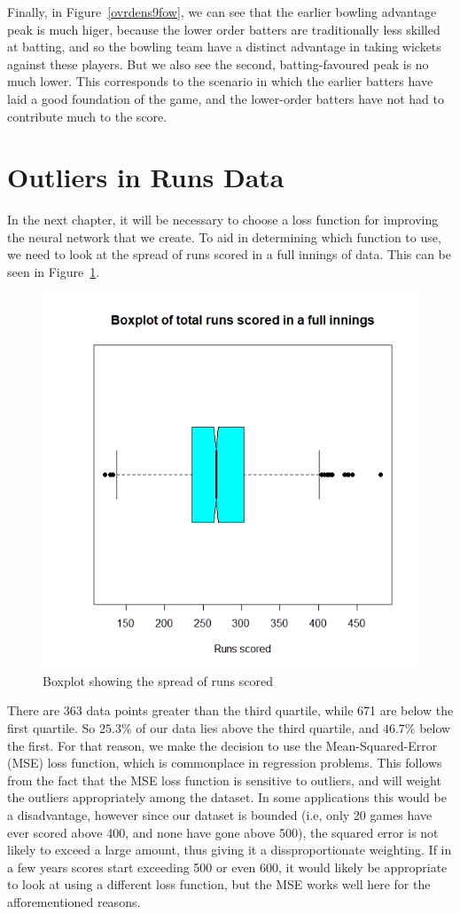 Finally, in Figure~\ref{ovrdens9fow}, we can see that the earlier bowling advantage peak is much higer, because the lower order batters are traditionally less skilled 
at batting, and so the bowling team have a distinct advantage in taking wickets against these players. But we also see the second, batting-favoured peak is no much lower.
This corresponds to the scenario in which the earlier batters have laid a good foundation of the game, and the lower-order batters have not had to contribute much to the score.

\section{Outliers in Runs Data}
\label{mse}
In the next chapter, it will be necessary to choose a loss function for improving the neural network that we create. To aid in determining which function to use, we need to look at the
spread of runs scored in a full innings of data. This can be seen in Figure~\ref{runsbox}.

\begin{figure}[h]
    \centering
    \includegraphics[width=0.4\linewidth]{figures/runsbox.png}
    \caption{Boxplot showing the spread of runs scored}
    \label{runsbox}
\end{figure}

There are 363 data points greater than the third quartile, while 671 are below the first quartile. So $25.3\%$ of our data lies above the third quartile, and
$46.7\%$ below the first. For that reason, we make the decision to use the Mean-Squared-Error (MSE) loss function, which is commonplace in regression problems.
This follows from the fact that the MSE loss function is sensitive to outliers, and will weight the outliers appropriately among the dataset. In some applications 
this would be a disadvantage, however since our dataset is bounded (i.e, only 20 games have ever scored above 400, and none have gone above 500), the squared error 
is not likely to exceed a large amount, thus giving it a dissproportionate weighting. If in a few years scores start exceeding 500 or even 600, it would likely 
be appropriate to look at using a different loss function, but the MSE works well here for the afforementioned reasons.

